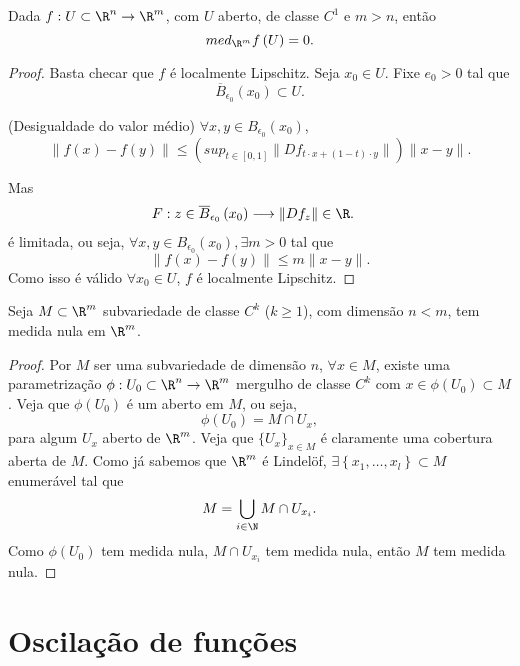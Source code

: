 \begin{corollary}
    Dada $f:U\subset \R^{n}\to \R^{m}$, com $U$ aberto, de classe $C^{1}$ e $m>n$, então \[
    med_{\R^{m}}f\left( U \right) = 0
    .\] 
\end{corollary}
\begin{proof}
    Basta checar que $f$ é localmente Lipschitz. Seja $x_0\in U$. Fixe $e_0>0$ tal que \[
    \overline{B}_{\epsilon_0}\left( x_0 \right) \subset U
    .\] 

	(Desigualdade do valor médio) $\forall x,y \in B_{\epsilon_0}\left( x_0 \right) $, \[
	    \|f\left( x \right) -f\left( y \right) \|\le (sup_{t\in \left[ 0,1 \right] }\|Df_{t\cdot x+\left( 1-t \right) \cdot y}\|) \|x-y\|
	.\] 

    Mas
    \begin{align*}
        F: z\in \overline{B}_{\epsilon_0}\left( x_0 \right)  &\longrightarrow \|Df_z\|\in \R 
    .\end{align*}
    é limitada, ou seja, $\forall x,y \in B_{\epsilon_0}\left( x_0 \right), \exists m>0$ tal que  \[
    \|f\left( x \right) -f\left( y \right) \| \le  m \|x-y\|
    .\] Como isso é válido $\forall x_0 \in U$, $f$ é localmente Lipschitz.
\end{proof}

\begin{corollary}
    Seja $M\subset \R^{m}$ subvariedade de classe $C^{k}$ ($k\ge 1$), com dimensão $n<m$, tem medida nula em $\R^{m}$.
\end{corollary}

\begin{proof}
    Por $M$ ser uma subvariedade de dimensão $n$, $\forall x\in M$, existe uma parametrização $\phi : U_0 \subset \R^{n}\to \R^{m}$ mergulho de classe $C^{k}$ com $x\in \phi\left(  U_0\right) \subset M  $. Veja que $\phi\left( U_0 \right) $ é um aberto em $M$, ou seja,  \[
    \phi\left( U_0 \right) = M\cap U_x
    ,\] para algum $U_x$ aberto de $\R^{m}$. Veja que $\{U_x\} _{x\in M}$ é claramente uma cobertura aberta de $M$. Como já sabemos que $\R^{m}$ é Lindelöf, $\exists \left\{ x_1,\ldots,x_l \right\} \subset M$ enumerável tal que \[
    M = \bigcup_{i\in \N} M\cap U_{x_i}
    .\] Como $\phi\left( U_0 \right) $ tem medida nula, $M\cap U_{x_i}$ tem medida nula, então $M$ tem medida nula.
\end{proof}

\section*{Oscilação de funções}

